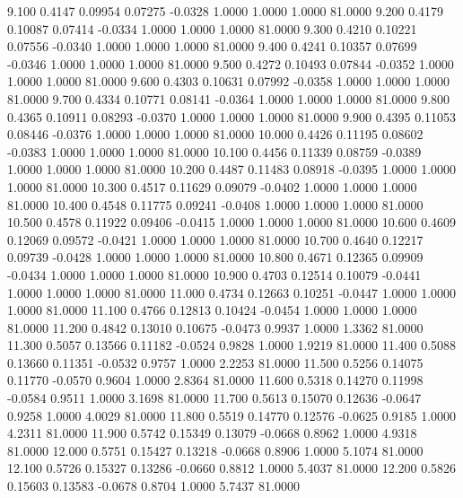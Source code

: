    9.100   0.4147   0.09954   0.07275  -0.0328   1.0000   1.0000   1.0000  81.0000
   9.200   0.4179   0.10087   0.07414  -0.0334   1.0000   1.0000   1.0000  81.0000
   9.300   0.4210   0.10221   0.07556  -0.0340   1.0000   1.0000   1.0000  81.0000
   9.400   0.4241   0.10357   0.07699  -0.0346   1.0000   1.0000   1.0000  81.0000
   9.500   0.4272   0.10493   0.07844  -0.0352   1.0000   1.0000   1.0000  81.0000
   9.600   0.4303   0.10631   0.07992  -0.0358   1.0000   1.0000   1.0000  81.0000
   9.700   0.4334   0.10771   0.08141  -0.0364   1.0000   1.0000   1.0000  81.0000
   9.800   0.4365   0.10911   0.08293  -0.0370   1.0000   1.0000   1.0000  81.0000
   9.900   0.4395   0.11053   0.08446  -0.0376   1.0000   1.0000   1.0000  81.0000
  10.000   0.4426   0.11195   0.08602  -0.0383   1.0000   1.0000   1.0000  81.0000
  10.100   0.4456   0.11339   0.08759  -0.0389   1.0000   1.0000   1.0000  81.0000
  10.200   0.4487   0.11483   0.08918  -0.0395   1.0000   1.0000   1.0000  81.0000
  10.300   0.4517   0.11629   0.09079  -0.0402   1.0000   1.0000   1.0000  81.0000
  10.400   0.4548   0.11775   0.09241  -0.0408   1.0000   1.0000   1.0000  81.0000
  10.500   0.4578   0.11922   0.09406  -0.0415   1.0000   1.0000   1.0000  81.0000
  10.600   0.4609   0.12069   0.09572  -0.0421   1.0000   1.0000   1.0000  81.0000
  10.700   0.4640   0.12217   0.09739  -0.0428   1.0000   1.0000   1.0000  81.0000
  10.800   0.4671   0.12365   0.09909  -0.0434   1.0000   1.0000   1.0000  81.0000
  10.900   0.4703   0.12514   0.10079  -0.0441   1.0000   1.0000   1.0000  81.0000
  11.000   0.4734   0.12663   0.10251  -0.0447   1.0000   1.0000   1.0000  81.0000
  11.100   0.4766   0.12813   0.10424  -0.0454   1.0000   1.0000   1.0000  81.0000
  11.200   0.4842   0.13010   0.10675  -0.0473   0.9937   1.0000   1.3362  81.0000
  11.300   0.5057   0.13566   0.11182  -0.0524   0.9828   1.0000   1.9219  81.0000
  11.400   0.5088   0.13660   0.11351  -0.0532   0.9757   1.0000   2.2253  81.0000
  11.500   0.5256   0.14075   0.11770  -0.0570   0.9604   1.0000   2.8364  81.0000
  11.600   0.5318   0.14270   0.11998  -0.0584   0.9511   1.0000   3.1698  81.0000
  11.700   0.5613   0.15070   0.12636  -0.0647   0.9258   1.0000   4.0029  81.0000
  11.800   0.5519   0.14770   0.12576  -0.0625   0.9185   1.0000   4.2311  81.0000
  11.900   0.5742   0.15349   0.13079  -0.0668   0.8962   1.0000   4.9318  81.0000
  12.000   0.5751   0.15427   0.13218  -0.0668   0.8906   1.0000   5.1074  81.0000
  12.100   0.5726   0.15327   0.13286  -0.0660   0.8812   1.0000   5.4037  81.0000
  12.200   0.5826   0.15603   0.13583  -0.0678   0.8704   1.0000   5.7437  81.0000
